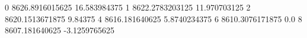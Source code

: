0 8626.8916015625 16.583984375
1 8622.2783203125 11.970703125
2 8620.1513671875 9.84375
4 8616.181640625 5.8740234375
6 8610.3076171875 0.0
8 8607.181640625 -3.1259765625
